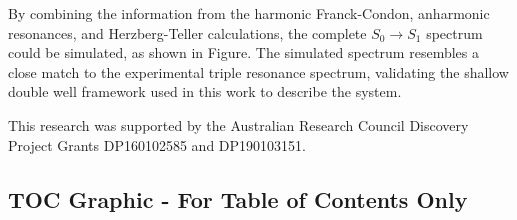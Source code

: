 \documentclass[journal=jpcafh,manuscript=article,layout=onecolumn, 12pt]{achemso}
\begin{document}
By combining the information from the harmonic Franck-Condon, anharmonic resonances, and Herzberg-Teller calculations, the complete $S_0\rightarrow S_1$ spectrum could be simulated, as shown in Figure. The simulated spectrum resembles a close match to the experimental triple resonance spectrum, validating the shallow double well framework used in this work to describe the system. 

\begin{acknowledgement}
	This research was supported by the Australian Research Council Discovery
	Project Grants DP160102585 and DP190103151.  
\end{acknowledgement}



\newpage
\onecolumn
\subsection{TOC Graphic - For Table of Contents Only}
\vspace{2ex}
\begin{center}
\end{center}
\end{document}
